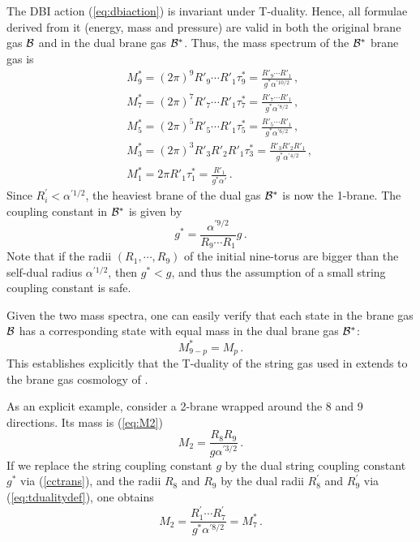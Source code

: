\documentclass[a4paper,twocolumn,nofootinbib,tightenlines,prd,aps,
               superscriptaddress]{revtex4} %
\newcommand{\al}{\alpha}
\newcommand{\cB}{{\cal{B}}}
\begin{document}
The DBI action (\ref{eq:dbiaction}) is invariant under T-duality.
Hence, all formulae derived from it (energy, mass and pressure)
are valid in both the original brane gas $\cB$ and in the dual
brane gas $\cB^*$. Thus, the mass spectrum of the $\cB^*$ brane
gas is
\begin{eqnarray}
  &&  M^*_{9}=(2\pi)^9  R'_9 \cdots R'_1 \tau^*_9 = \frac{R'_9 \cdots R'_1}{g^* \al^{'10/2}}\label{eq:M9}\,, \\
  &&  M^*_{7}=(2\pi)^7  R'_7 \cdots R'_1 \tau^*_7 = \frac{R'_7 \cdots R'_1}{g^* \al^{'8/2}}\,,\\
  &&  M^*_{5}=(2\pi)^5  R'_5 \cdots R'_1 \tau^*_5 = \frac{R'_5 \cdots R'_1}{g^* \al^{'6/2}}\,,\\
  &&  M^*_{3}=(2\pi)^3  R'_3 R'_2 R'_1 \tau^*_3 = \frac{R'_3 R'_2 R'_1}{g^* \al^{'4/2}}\,,\\
  &&  M^*_{1}= 2\pi  R'_1 \tau^*_1 = \frac{R'_1}{g^* \al'}\,.
  \label{eq:M1}
\end{eqnarray}
Since $R_i^{'} < \al^{' 1/2}$, the heaviest brane of the dual gas
$\cB^*$ is now the 1-brane. The coupling constant in $\cB^*$ is
given by
\begin{equation} \label{cctrans}
    g^*=\frac{\al^{'9/2}}{R_9 \cdots R_1}g\,.
\end{equation}
Note that if the radii $(R_1,\cdots,R_9)$ of the initial
nine-torus are bigger than the self-dual radius $\al^{'1/2}$, then
$g^*<g$, and thus the assumption of a small string coupling
constant is safe.


Given the two mass spectra, one can easily verify that each state
in the brane gas $\cB$ has a corresponding state with equal mass
in the dual brane gas $\cB^*$:
\begin{equation}
    M^*_{9-p} = M_p \, .
\end{equation}
This establishes explicitly that the T-duality of the string gas
used in \cite{Brandenberger:1989aj} extends to the brane gas
cosmology of \cite{Alexander:2000xv}.

As an explicit example, consider a 2-brane wrapped around the 8
and 9 directions. Its mass is (\ref{eq:M2})
\begin{equation}
M_{2} = \frac{R_8 R_9}{g \al^{'3/2}} \, .
\end{equation}
If we replace the string coupling constant $g$ by the dual string
coupling constant $g^*$ via (\ref{cctrans}), and the radii $R_8$
and $R_9$ by the dual radii $R_8^{'}$ and $R_9^{'}$ via
(\ref{eq:tdualitydef}), one obtains
\begin{equation}
M_{2} = \frac{R_1^{'} \cdots R_7^{'}}{g^* \al^{' 8/2}} = M_{7}^*
\, .
\end{equation}
\end{document}

